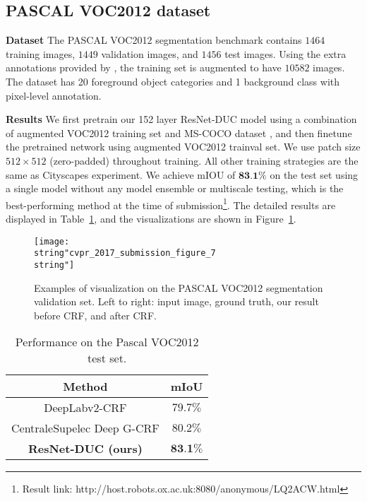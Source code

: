 \documentclass[10pt,twocolumn,letterpaper]{article}
\begin{document}
\subsection{PASCAL VOC2012 dataset}
\textbf{Dataset} The PASCAL VOC2012 segmentation benchmark contains $1464$ training images, $1449$ validation images, and $1456$ test images. Using the extra annotations provided by \cite{hariharan2011semantic}, the training set is augmented to have $10582$ images. The dataset has 20 foreground object categories and 1 background class with pixel-level annotation.

\textbf{Results} We first pretrain our 152 layer ResNet-DUC model using a combination of augmented VOC2012 training set and MS-COCO dataset \cite{lin2014microsoft}, and then finetune the pretrained network using augmented VOC2012 trainval set. We use patch size $512\times 512$ (zero-padded) throughout training. All other training strategies are the same as Cityscapes experiment. We achieve mIOU of $\textbf{83.1\%}$ on the test set using a single model without any model ensemble or multiscale testing, which is the best-performing method at the time of submission\footnote{Result link: http://host.robots.ox.ac.uk:8080/anonymous/LQ2ACW.html}. The detailed results are displayed in Table~\ref{tab:voc}, and the visualizations are shown in Figure~\ref{Figure7_voc}. 
\begin{figure}[h]
\begin{center}
\texttt{[image: \\string"cvpr\_2017\_submission\_figure\_7\\string"]}
\end{center}
\caption{Examples of visualization on the PASCAL VOC2012 segmentation validation set. Left to right: input image, ground truth, our result before CRF, and after CRF.}
\label{Figure7_voc}
\vspace{-5pt}
\end{figure}

\begin{table}[ht]
\begin{center}
\begin{tabular}{c|c} \toprule[1.5pt]
    Method & mIoU\\ \midrule
  DeepLabv2-CRF\cite{chen2016deeplab} &	$79.7\%$ \\
  CentraleSupelec Deep G-CRF\cite{chandra2016fast} &	$80.2\%$ \\
  \textbf{ResNet-DUC (ours)} & $\textbf{83.1\%}$ \\ \bottomrule[1.5pt]
\end{tabular}
\vspace{2pt}
\caption{Performance on the Pascal VOC2012 test set.}
\label{tab:voc} 
\end{center}
\vspace{-15pt}
\end{table}
\end{document}
